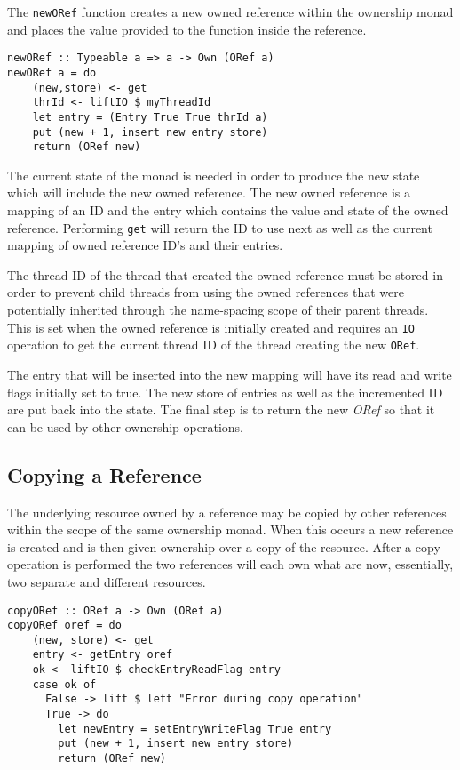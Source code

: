 \documentclass[onehalf,11pt]{beavtex}
\begin{document}
The \texttt{newORef} function creates a new owned reference
within the ownership monad and places the value provided to the function
inside the reference. 

\begin{verbatim}
newORef :: Typeable a => a -> Own (ORef a)
newORef a = do
    (new,store) <- get
    thrId <- liftIO $ myThreadId
    let entry = (Entry True True thrId a)
    put (new + 1, insert new entry store)
    return (ORef new)
\end{verbatim}

The current state of the monad is needed in order
to produce the new state which will include the new owned reference.
The new owned reference is a mapping of an ID and the entry which contains
the value and state of the owned reference.
Performing \texttt{get} will return the ID to use next as well as the current
mapping of owned reference ID's and their entries.

The thread ID of the thread that created the owned reference must
be stored in order to prevent child threads from using the owned references that
were potentially inherited through the name-spacing scope of their parent
threads.  This is set when the owned reference is initially created and requires
an \texttt{IO} operation to get the current thread ID of the thread
creating the new \texttt{ORef}.

The entry that will be inserted into the new mapping will have its read and
write flags initially set to true.
The new store of entries as well as the incremented ID are put back into the
state.
The final step is to return the new \textit{ORef} so that it can be used by other
ownership operations.

\subsection{Copying a Reference}

The underlying resource owned by a reference may be copied by other references
within the scope of the same ownership monad.  When this occurs a new
reference is created and is then given ownership over a copy of the resource.
After a copy operation is performed the two references will each own what are now,
essentially, two separate and different resources.

\begin{verbatim}
copyORef :: ORef a -> Own (ORef a)
copyORef oref = do
    (new, store) <- get
    entry <- getEntry oref
    ok <- liftIO $ checkEntryReadFlag entry
    case ok of
      False -> lift $ left "Error during copy operation"
      True -> do
        let newEntry = setEntryWriteFlag True entry
        put (new + 1, insert new entry store)
        return (ORef new)
\end{verbatim}
\end{document}

